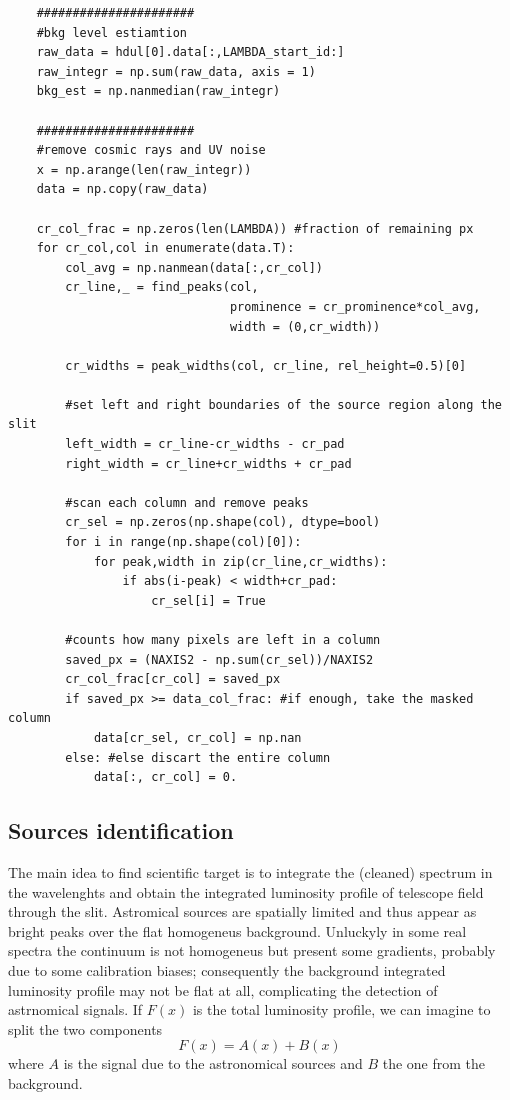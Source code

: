 \begin{lstlisting}
	######################
	#bkg level estiamtion
	raw_data = hdul[0].data[:,LAMBDA_start_id:]
	raw_integr = np.sum(raw_data, axis = 1)
	bkg_est = np.nanmedian(raw_integr)  
	
	######################
	#remove cosmic rays and UV noise
	x = np.arange(len(raw_integr)) 
	data = np.copy(raw_data)
	
	cr_col_frac = np.zeros(len(LAMBDA)) #fraction of remaining px
	for cr_col,col in enumerate(data.T):
		col_avg = np.nanmean(data[:,cr_col])
		cr_line,_ = find_peaks(col,
							   prominence = cr_prominence*col_avg,
							   width = (0,cr_width))
	
		cr_widths = peak_widths(col, cr_line, rel_height=0.5)[0]
	
		#set left and right boundaries of the source region along the slit
		left_width = cr_line-cr_widths - cr_pad
		right_width = cr_line+cr_widths + cr_pad
	
		#scan each column and remove peaks
		cr_sel = np.zeros(np.shape(col), dtype=bool)
		for i in range(np.shape(col)[0]):
			for peak,width in zip(cr_line,cr_widths):
				if abs(i-peak) < width+cr_pad:
					cr_sel[i] = True
	
		#counts how many pixels are left in a column
		saved_px = (NAXIS2 - np.sum(cr_sel))/NAXIS2
		cr_col_frac[cr_col] = saved_px
		if saved_px >= data_col_frac: #if enough, take the masked column
			data[cr_sel, cr_col] = np.nan
		else: #else discart the entire column
			data[:, cr_col] = 0.
\end{lstlisting}



\subsection{Sources identification}
The main idea to find scientific target is to integrate the (cleaned) spectrum in the wavelenghts and obtain the integrated luminosity profile of telescope field through the slit. Astromical sources are spatially limited and thus appear as bright peaks over the flat homogeneus background. Unluckyly in some real spectra the continuum is not homogeneus but present some gradients, probably due to some calibration biases; consequently the background integrated luminosity profile may not be flat at all, complicating the detection of astrnomical signals. If $F(x)$ is the total luminosity profile, we can imagine to split the two components
\begin{equation}
	F(x)=A(x)+B(x)
\end{equation}
where $A$ is the signal due to the astronomical sources and $B$ the one from the background.

